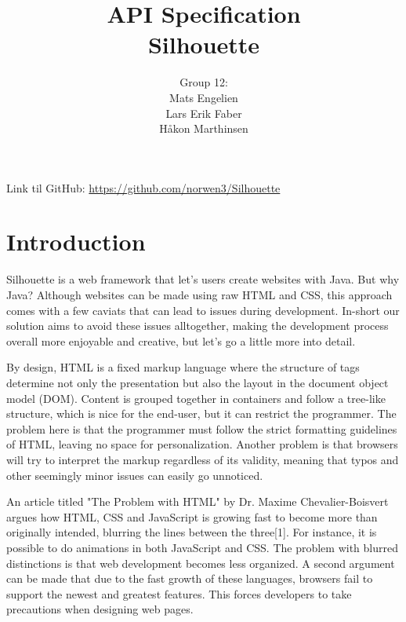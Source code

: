 \documentclass[12pt]{article}
\begin{document}
\title{%
    API Specification\\
    \large Silhouette}
\author{%
    Group 12:\\
    Mats Engelien\\
    Lars Erik Faber\\
    Håkon Marthinsen}
\date{}
\maketitle

\newpage

\tableofcontents

\newpage

Link til GitHub: \href{https://github.com/norwen3/Silhouette}{https://github.com/norwen3/Silhouette}

\section{Introduction}

Silhouette is a web framework that let's users create websites with Java. But why Java? Although websites can be made using raw HTML and CSS, this approach comes with a few caviats that can lead to issues during development. In-short our solution aims to avoid these issues alltogether, making the development process overall more enjoyable and creative, but let's go a little more into detail.

By design, HTML is a fixed markup language where the structure of tags determine not only the presentation but also the layout in the document object model (DOM). Content is grouped together in containers and follow a tree-like structure, which is nice for the end-user, but it can restrict the programmer. The problem here is that the programmer must follow the strict formatting guidelines of HTML, leaving no space for personalization. Another problem is that browsers will try to interpret the markup regardless of its validity, meaning that typos and other seemingly minor issues can easily go unnoticed.

An article titled "The Problem with HTML" by Dr. Maxime Chevalier-Boisvert argues how HTML, CSS and JavaScript is growing fast to become more than originally intended, blurring the lines between the three[1]. For instance, it is possible to do animations in both JavaScript and CSS. The problem with blurred distinctions is that web development becomes less organized. A second argument can be made that due to the fast growth of these languages, browsers fail to support the newest and greatest features. This forces developers to take precautions when designing web pages.
\end{document}

